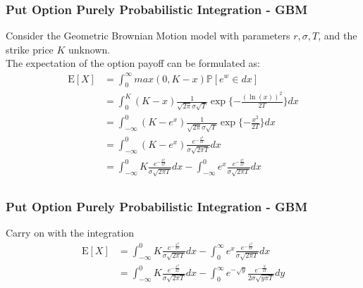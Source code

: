 \documentclass{beamer}
\begin{document}
\begin{frame}
\frametitle{Put Option Purely Probabilistic Integration - GBM}
Consider the Geometric Brownian Motion model with parameters $r, \sigma, T$, and the strike price $K$ unknown.\\
The expectation of the option payoff can be formulated as:
\begin{equation*}
\begin{split}
\mathrm{E}[X] 
&= \int_{0}^{\infty} max(0, K-x) \mathbb{P}[e^{w} \in dx] \\
&= \int_{0}^{K} (K-x) \frac{1}{\sqrt{2\pi}\sigma\sqrt{T}} \exp\{-\frac{(\ln(x))^{2}}{2T}\} dx\\
&= \int_{-\infty}^{0} (K-e^{x}) \frac{1}{\sqrt{2\pi}\sigma\sqrt{T}} \exp\{-\frac{x^{2}}{2T}\} dx\\
&= \int_{-\infty}^{0} (K-e^{x}) \frac{e^{-\frac{x^{2}}{2T}}}{\sigma\sqrt{2\pi T}} dx\\
&= \int_{-\infty}^{0} K \frac{e^{-\frac{x^{2}}{2T}}}{\sigma\sqrt{2\pi T}} dx - \int_{-\infty}^{0} e^{x} \frac{e^{-\frac{x^{2}}{2T}}}{\sigma\sqrt{2\pi T}} dx\\
\end{split}
\end{equation*}
\end{frame}

\begin{frame}
\frametitle{Put Option Purely Probabilistic Integration - GBM}
Carry on with the integration
\begin{equation*}
\begin{split}
\mathrm{E}[X] 
&= \int_{-\infty}^{0} K \frac{e^{-\frac{x^{2}}{2T}}}{\sigma\sqrt{2\pi T}} dx - \int_{0}^{\infty} e^{x} \frac{e^{-\frac{x^{2}}{2T}}}{\sigma\sqrt{2\pi T}} dx\\
&= \int_{-\infty}^{0} K \frac{e^{-\frac{x^{2}}{2T}}}{\sigma\sqrt{2\pi T}} dx - \int_{0}^{\infty} e^{-\sqrt{y}} \frac{e^{-\frac{y}{2T}}}{2\sigma\sqrt{y\pi{T}}} dy\\
\end{split}
\end{equation*}
\end{frame}
\end{document}
